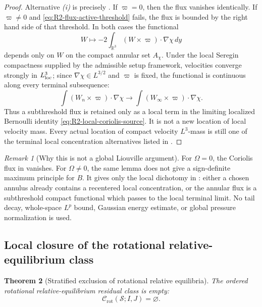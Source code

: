 \documentclass[11pt]{amsart}
\numberwithin{equation}{section}
\theoremstyle{plain}
\newtheorem{theorem}{Theorem}[section]
\theoremstyle{definition}
\theoremstyle{remark}
\newtheorem{remark}[theorem]{Remark}
\newcommand{\Crot}{\mathcal C_{\mathrm{rot}}}
\begin{document}
\begin{proof}
Alternative \emph{(i)} is precisely
.  If \(\varpi=0\), then the flux
vanishes identically.  If \(\varpi\ne0\) and
\eqref{eq:R2-flux-active-threshold} fails, the flux is bounded by the right hand
side of that threshold.  In both cases the functional
\[
   W\longmapsto -2\int_{\mathbb R^3}(W\times\varpi)\cdot\nabla\chi\,dy
\]
depends only on \(W\) on the compact annular set \(A_\chi\).  Under the local
Seregin compactness supplied by the admissible setup framework, velocities converge
strongly in
\(L^3_{\rm loc}\); since \(\nabla\chi\in L^{3/2}\) and \(\varpi\) is fixed, the
functional is continuous along every terminal subsequence:
\[
   \int (W_n\times\varpi)\cdot\nabla\chi
   \longrightarrow
   \int (W_\infty\times\varpi)\cdot\nabla\chi .
\]
Thus a subthreshold flux is retained only as a local term in the limiting
localized Bernoulli identity \eqref{eq:R2-local-coriolis-source}.  It is not a
new location of local velocity mass.  Every actual location of compact velocity
\(L^3\)-mass is still one of the terminal local concentration alternatives listed in
.
\end{proof}

\begin{remark}[Why this is not a global Liouville argument]
\label{rem:R2-no-global-liouville}
For \(\Omega=0\), the Coriolis flux in
 vanishes.  For \(\Omega\ne0\), the
same lemma does not give a sign-definite maximum principle for \(B\).  It gives
only the local dichotomy in : either a
chosen annulus already contains a recentered local concentration, or the
annular flux is a subthreshold compact functional which passes to the local
terminal limit.  No tail decay, whole-space \(L^p\) bound, Gaussian energy
estimate, or global pressure normalization is used.
\end{remark}

\subsection{Local closure of the rotational relative-equilibrium class}

\begin{theorem}[Stratified exclusion of rotational relative equilibria]
\label{thm:R2-exclusion-safe}
The ordered rotational relative-equilibrium residual class is empty:
\begin{equation}\label{eq:R2-empty-safe}
   \Crot(\mathcal S;I,J)=\varnothing .
\end{equation}
\end{theorem}
\end{document}
